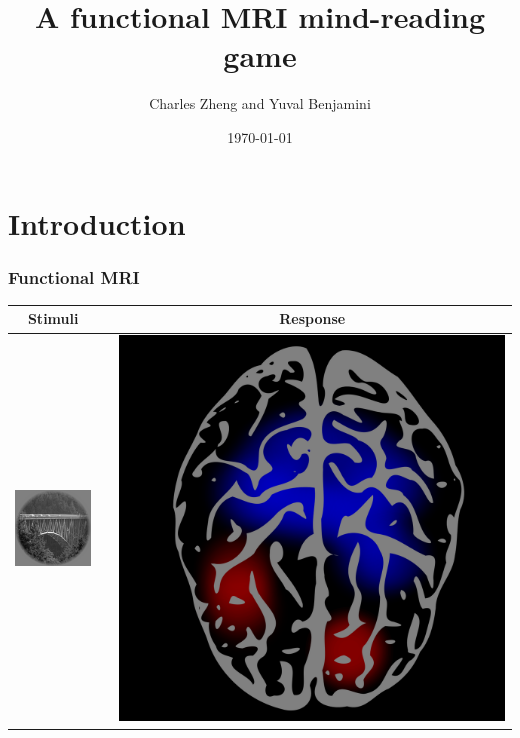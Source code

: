 \documentclass{beamer}
\title[Group talk]{A functional MRI mind-reading game}
\author{Charles Zheng and Yuval Benjamini} %
\institute[Stanford] %
{Stanford University}
\date{\today} %
\begin{document}
\begin{frame}
\titlepage %
\end{frame}

\section{Introduction}

\frame{\sectionpage}

\begin{frame}
\frametitle{Functional MRI}
\begin{center}
\begin{tabular}{ccc}
\hline
Stimuli & & Response\\ \hline
\includegraphics[scale = .52]{img1.png} & \hspace{1in} & \includegraphics[scale = 0.07]{brain1.png} \\ \hline

\end{tabular}
\end{center}
\end{frame}
\end{document}
